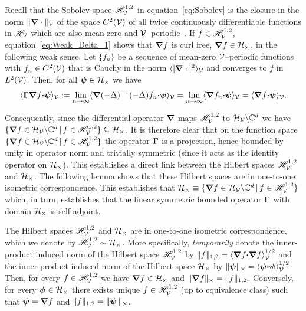 \documentclass[amsa]{ipart}
\begin{document}
Recall that the Sobolev space $\mathscr{H}^{1,2}_{\mathcal{V}}$ in
equation~\eqref{eq:Sobolev} is the closure in the norm
$\|\mbox{\boldmath${\nabla}$}\cdot\|_{\mathcal{V}}$ of the space $C^2(\mathcal{V})$ 
of all twice continuously differentiable functions in $\mathscr{H}_{\mathcal{V}}$
which are also mean-zero and
$\mathcal{V}$--periodic~\cite{Bhattacharya:AAP:1999:951}.   
If $f\in\mathscr{H}^{1,2}_{\mathcal{V}}$, equation~\eqref{eq:Weak_Delta_1} shows that
$\mbox{\boldmath${\nabla}$} f$  is curl free, $\mbox{\boldmath${\nabla}$} f\in\mathcal{H}_\times$,  in the 
following weak sense.  Let $\{ f_n\}$ be a sequence of mean-zero
$\mathcal{V}$--periodic functions with $f_n\in C^2(\mathcal{V})$ that is Cauchy in the
norm $\langle|\mbox{\boldmath${\nabla}$}\cdot|^2\rangle_{\mathcal{V}}$ and converges to  $f$ in $L^2(\mathcal{V})$. Then,
for all $\mbox{\boldmath${\psi}$}\in\mathcal{H}_\times$ we have
%
\begin{align}\label{eq:Gamma_Proj_H12}
  \langle\bGamma\bnabla f\bcdot\bpsi\rangle_{\Vc}
  :=\lim_{n\to\infty}\langle\bnabla(-\Delta)^{-1}(-\Delta)f_n\bcdot\bpsi\rangle_{\Vc}
  =\lim_{n\to\infty}\langle\bnabla f_n\bcdot\bpsi\rangle_{\Vc}
  =\langle\bnabla f\bcdot\bpsi\rangle_{\Vc}.
\end{align}
%


Consequently, since the differential operator $\mbox{\boldmath${\nabla}$}$ maps
$\mathscr{H}^{1,2}_{\mathcal{V}}$ to $\mathcal{H}_{\mathcal{V}}\backslash\mathbb{C}^d$ we have $\{\mbox{\boldmath${\nabla}$}
f\in\mathcal{H}_{\mathcal{V}}\backslash\mathbb{C}^d \,|\, f\in\mathscr{H}^{1,2}_{\mathcal{V}}\}\subseteq\mathcal{H}_\times$.  
It is therefore clear that on the function space
$\{\mbox{\boldmath${\nabla}$} f\in\mathcal{H}_{\mathcal{V}}\backslash\mathbb{C}^d \,|\, f\in\mathscr{H}^{1,2}_{\mathcal{V}}\}$ the operator
$\mbox{\boldmath${\Gamma}$}$ is a projection, hence bounded by unity in operator
norm and trivially symmetric (since it acts as the identity operator
on $\mathcal{H}_\times$). This establishes a direct link between the Hilbert spaces
$\mathscr{H}^{1,2}_{\mathcal{V}}$ and $\mathcal{H}_\times$. The following lemma shows that these
Hilbert spaces are 
in one-to-one isometric correspondence. This establishes that
$\mathcal{H}_\times\equiv\{\mbox{\boldmath${\nabla}$} f\in\mathcal{H}_{\mathcal{V}}\backslash\mathbb{C}^d \,|\, f\in\mathscr{H}^{1,2}_{\mathcal{V}}\}$ which, in turn,
establishes that the linear symmetric bounded operator $\mbox{\boldmath${\Gamma}$}$ with
domain $\mathcal{H}_\times$ is self-adjoint.    


%
\begin{lemma}\label{lem:Isometry_Fs_Fc}
%  
  The Hilbert spaces $\mathscr{H}^{1,2}_{\mathcal{V}}$ and $\mathcal{H}_\times$ are in one-to-one
  isometric correspondence, which we denote by
  $\mathscr{H}^{1,2}_{\mathcal{V}}\sim\mathcal{H}_\times$. More specifically, \emph{temporarily} denote the
  inner-product induced norm of the Hilbert space $\mathscr{H}^{1,2}_{\mathcal{V}}$
  by $\|f\|_{1,2}=\langle\mbox{\boldmath${\nabla}$} f\mbox{\boldmath${\cdot}$}\mbox{\boldmath${\nabla}$} f\rangle_{\mathcal{V}}^{1/2}$ and the
  inner-product induced norm of the Hilbert space $\mathcal{H}_\times$
  by $\|\mbox{\boldmath${\psi}$}\|_\times=\langle\mbox{\boldmath${\psi}$}\mbox{\boldmath${\cdot}$}\mbox{\boldmath${\psi}$}\rangle_{\mathcal{V}}^{1/2}$. Then, for
  every $f\in\mathscr{H}^{1,2}_{\mathcal{V}}$ we have $\mbox{\boldmath${\nabla}$} f\in\mathcal{H}_\times$ and $\|\mbox{\boldmath${\nabla}$}
  f\|_\times=\|f\|_{1,2}$. Conversely, for every $\boldsymbol{\psi}\in\mathcal{H}_\times$ there exists
  unique $f\in\mathscr{H}^{1,2}_{\mathcal{V}}$ (up to equivalence class) such that
  $\boldsymbol{\psi}=\mbox{\boldmath${\nabla}$} f$ and $\|f\|_{1,2}=\|\boldsymbol{\psi}\,\|_\times$. 
%  
\end{lemma}
%
\end{document}
